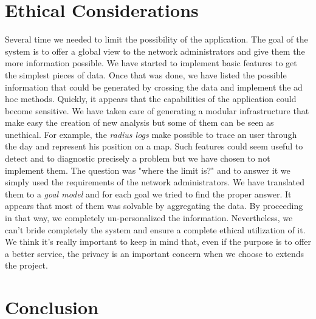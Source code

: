 \section{Ethical Considerations}
Several time we needed to limit the possibility of the application. The goal of the system is to offer a global view to the network administrators and give them the more information possible. We have started to implement basic features to get the simplest pieces of data. Once that was done, we have listed the possible information that could be generated by crossing the data and implement the ad hoc methods. Quickly, it appears that the capabilities of the application could become sensitive. We have taken care of generating a modular infrastructure that make easy the creation of new analysis but some of them can be seen as unethical. For example, the \emph{radius logs} make possible to trace an user through the day and represent his position on a map. Such features could seem useful to detect and to diagnostic precisely a problem but we have chosen to not implement them. The question was "where the limit is?" and to answer it we simply used the requirements of the network administrators. We have translated them to a \emph{goal model} and for each goal we tried to find the proper answer. It appears that most of them was solvable by aggregating the data. By proceeding in that way, we completely un-personalized the information. 
Nevertheless, we can't bride completely the system and ensure a complete ethical utilization of it. We think it's really important to keep in mind that, even if the purpose is to offer a better service, the privacy is an important concern when we choose to extends the project.

\section{Conclusion}
